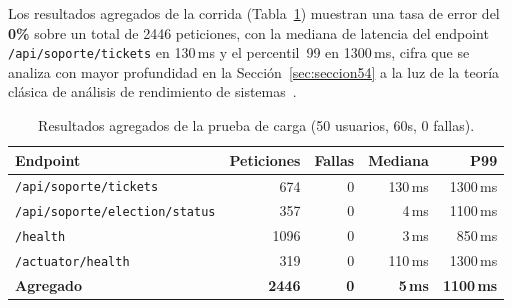 ﻿\documentclass[11pt,a4paper]{article}
\begin{document}
\noindent Los resultados agregados de la corrida (Tabla~\ref{tab:locust-results}) muestran una tasa de error del \textbf{0\%} sobre un total de 2446 peticiones, con la mediana de latencia del endpoint \texttt{/api/soporte/tickets} en 130\,ms y el percentil~99 en 1300\,ms, cifra que se analiza con mayor profundidad en la Secci\'on~\ref{sec:seccion54} a la luz de la teor\'ia cl\'asica de an\'alisis de rendimiento de sistemas~\cite{jain1991art}.

\begin{table}[H]
\centering
\caption{Resultados agregados de la prueba de carga (50 usuarios, 60s, 0 fallas).}
\label{tab:locust-results}
\begin{tabularx}{\textwidth}{@{}l r r r r@{}}
\toprule
\textbf{Endpoint} & \textbf{Peticiones} & \textbf{Fallas} & \textbf{Mediana} & \textbf{P99} \\
\midrule
\texttt{/api/soporte/tickets} & 674 & 0 & 130\,ms & 1300\,ms \\
\texttt{/api/soporte/election/status} & 357 & 0 & 4\,ms & 1100\,ms \\
\texttt{/health} & 1096 & 0 & 3\,ms & 850\,ms \\
\texttt{/actuator/health} & 319 & 0 & 110\,ms & 1300\,ms \\
\midrule
\textbf{Agregado} & \textbf{2446} & \textbf{0} & \textbf{5\,ms} & \textbf{1100\,ms} \\
\bottomrule
\end{tabularx}
\end{table}
\end{document}
